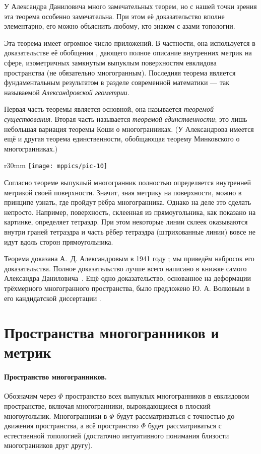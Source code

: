 \documentclass[oneside,a4paper]{article}
\begin{document}
У Александра Даниловича много замечательных теорем, но с нашей точки зрения эта теорема особенно замечательна.
При этом её доказательство вполне элементарно, его можно объяснить любому, кто знаком с азами топологии.

Эта теорема имеет огромное число приложений.
В частности, она используется в доказательстве её обобщения \cite{alexandrov-1948},
дающего полное описание внутренних метрик на сфере, изометричных замкнутым выпуклым поверхностям  евклидова пространства (не обязательно многогранным).
Последняя теорема является фундаментальным результатом в разделе современной математики --- так называемой \emph{Александровской геометрии}.

Первая часть теоремы является основной, она называется \emph{теоремой существования}.
Вторая часть называется \emph{теоремой единственности}; это лишь небольшая вариация теоремы Коши о многогранниках.
(У Александрова имеется ещё и другая теорема единственности, обобщающая теорему Минковского о многогранниках.)

\begin{wrapfigure}{r}{30mm}
\vskip-4mm
\centering
\texttt{[image: mppics/pic-10]}
\vskip-0mm
\end{wrapfigure}

Согласно теореме выпуклый многогранник полностью определяется внутренней метрикой своей поверхности.
Значит, зная метрику на поверхности, можно в принципе узнать, где пройдут рёбра многогранника.
Однако на деле это сделать непросто.
Например, поверхность, склеенная из прямоугольника, как показано на картинке, определяет тетраэдр.
При этом некоторые линии склеек оказываются внутри граней тетраэдра и часть рёбер тетраэдра (штрихованные линии) вовсе не идут вдоль сторон прямоугольника.

Теорема доказана А.~Д. Александровым в 1941 году \cite{alexandrov-1941};
мы приведём набросок его доказательства. 
Полное доказательство лучше всего написано в книжке самого Александра Даниловича~\cite{alexandrov}.
Ещё одно доказательство, основанное на деформации трёхмерного многогранного пространства, было предложено Ю. А. Волковым в его кандидатской диссертации \cite{volkov}.


\section{Пространства многогранников и метрик}

\paragraph{Пространство многогранников.}
Обозначим через $\Phi$ пространство всех выпуклых многогранников в евклидовом пространстве, включая многогранники, вырождающиеся в плоский многоугольник.
Многогранники в $\Phi$ будут рассматриваться с точностью до движения пространства, а всё пространство $\Phi$ будет рассматриваться с естественной топологией (достаточно интуитивного понимания близости многогранников друг другу).
\end{document}
